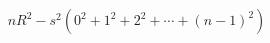 \documentclass[preview]{standalone}
\begin{document}
\begin{align*}
nR^2 - s^2 ( 0^2 +1^2 +2^2 +\cdots +(n-1)^2 )
\end{align*}
\end{document}
